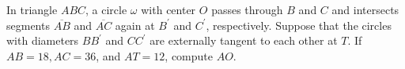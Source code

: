 In triangle $A B C$, a circle $\omega$ with center $O$ passes through $B$ and $C$ and intersects segments $\overline{A B}$ and $\overline{A C}$ again at $B^{\prime}$ and $C^{\prime}$, respectively. Suppose that the circles with diameters $B B^{\prime}$ and $C C^{\prime}$ are externally tangent to each other at $T$. If $A B=18, A C=36$, and $A T=12$, compute $A O$.